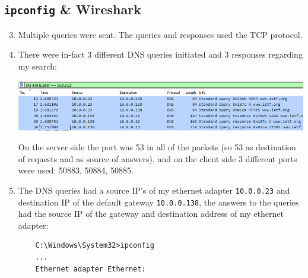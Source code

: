\subsection{\texttt{ipconfig} \& Wireshark}
\begin{enumerate}[label=\textbf{\alph*.}]
    \setcounter{enumi}{2}
    \item Multiple queries were sent. The queries and responses used the TCP protocol.
    \item There were in-fact 3 different DNS queries initiated and 3 responses regarding my search:
    \begin{center}
		\includegraphics[width=1.2 \textwidth]{resources/dns1.png}\centering
	\end{center}
    On the server side the port was 53 in all of the packets (so 53 as destination of requests
    and as source of answers), and on the client side 3 different ports were used: 50883, 50884, 50885.
    \item The DNS queries had a source IP's of my ethernet adapter \texttt{10.0.0.23} and destination IP
    of the default gateway \texttt{10.0.0.138}, the answers to the queries had the source IP of the
    gateway and destination address of my ethernet adapter:
    \begin{verbatim}
    C:\Windows\System32>ipconfig
    ...
    Ethernet adapter Ethernet:


\end{verbatim}
\end{enumerate}
